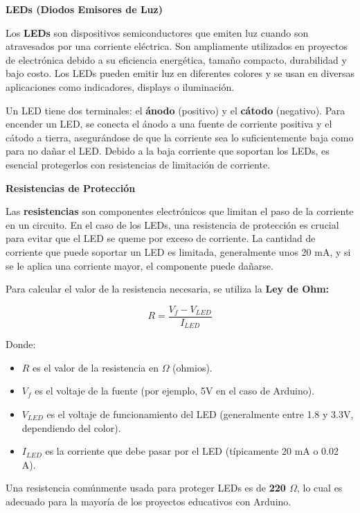 \textbf{LEDs (Diodos Emisores de Luz)}

Los \textbf{LEDs} son dispositivos semiconductores que emiten luz cuando son atravesados por una corriente eléctrica. Son ampliamente utilizados en proyectos de electrónica debido a su eficiencia energética, tamaño compacto, durabilidad y bajo costo. Los LEDs pueden emitir luz en diferentes colores y se usan en diversas aplicaciones como indicadores, displays o iluminación.

Un LED tiene dos terminales: el \textbf{ánodo} (positivo) y el \textbf{cátodo} (negativo). Para encender un LED, se conecta el ánodo a una fuente de corriente positiva y el cátodo a tierra, asegurándose de que la corriente sea lo suficientemente baja como para no dañar el LED. Debido a la baja corriente que soportan los LEDs, es esencial protegerlos con resistencias de limitación de corriente.

\textbf{Resistencias de Protección}

Las \textbf{resistencias} son componentes electrónicos que limitan el paso de la corriente en un circuito. En el caso de los LEDs, una resistencia de protección es crucial para evitar que el LED se queme por exceso de corriente. La cantidad de corriente que puede soportar un LED es limitada, generalmente unos 20 mA, y si se le aplica una corriente mayor, el componente puede dañarse.

Para calcular el valor de la resistencia necesaria, se utiliza la \textbf{Ley de Ohm:}

\begin{equation*}
  R = \frac{V_f - V_{LED}}{I_{LED}}
\end{equation*}

Donde:

\begin{itemize}
  \item \textbf{$R$} es el valor de la resistencia en $\Omega$ (ohmios).
  \item \textbf{$V_f$} es el voltaje de la fuente (por ejemplo, 5V en el caso de Arduino).
  \item \textbf{$V_{LED}$} es el voltaje de funcionamiento del LED (generalmente entre 1.8 y 3.3V, dependiendo del color).
  \item \textbf{$I_{LED}$} es la corriente que debe pasar por el LED (típicamente 20 mA o 0.02 A).
\end{itemize}

Una resistencia comúnmente usada para proteger LEDs es de \textbf{220 $\Omega$}, lo cual es adecuado para la mayoría de los proyectos educativos con Arduino.

